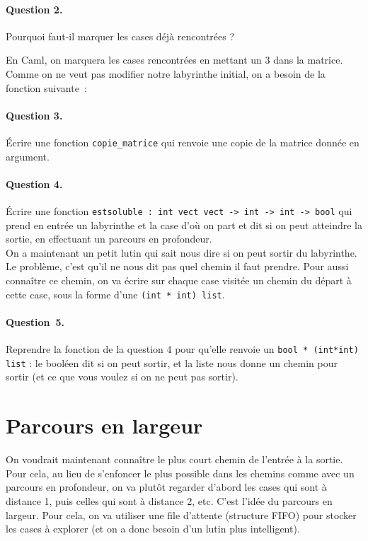 \documentclass[10pt,a4paper]{article}
\begin{document}
\paragraph{Question 2.} Pourquoi faut-il marquer les cases déjà rencontrées ?

En Caml, on marquera les cases rencontrées en mettant un 3 dans la matrice.
Comme on ne veut pas modifier notre labyrinthe initial, on a besoin de la 
fonction suivante :
\paragraph{Question 3.} Écrire une fonction \texttt{copie\_matrice} qui renvoie
une copie de la matrice donnée en argument.

\paragraph{Question 4.} Écrire une fonction 
\texttt{estsoluble : int vect vect -> int -> int -> bool} qui prend en entrée un
labyrinthe et la case d'où on part et dit si on peut atteindre la sortie, en 
effectuant un parcours en profondeur.
\\

On a maintenant un petit lutin qui sait nous dire si on peut sortir du 
labyrinthe. Le problème, c'est qu'il ne nous dit pas quel chemin il faut 
prendre. Pour aussi connaître ce chemin, on va écrire sur chaque case visitée
un chemin du départ à cette case, sous la forme d'une \texttt{(int * int) list}.

\paragraph{Question 5.} Reprendre la fonction de la question 4 pour qu'elle 
renvoie un \texttt{bool * (int*int) list} : le booléen dit si on peut sortir,
et la liste nous donne un chemin pour sortir (et ce que vous voulez si on ne 
peut pas sortir).

\section{Parcours en largeur}
On voudrait maintenant connaître le plus court chemin de l'entrée à la sortie.
Pour cela, au lieu de s'enfoncer le plus possible dans les chemins comme avec
un parcours en profondeur, on va plutôt regarder d'abord les cases qui sont
à distance 1, puis celles qui sont à distance 2, etc. C'est l'idée du parcours
en largeur. Pour cela, on va utiliser une file d'attente (structure FIFO) pour
stocker les cases à explorer (et on a donc besoin d'un lutin plus intelligent).
\end{document}
